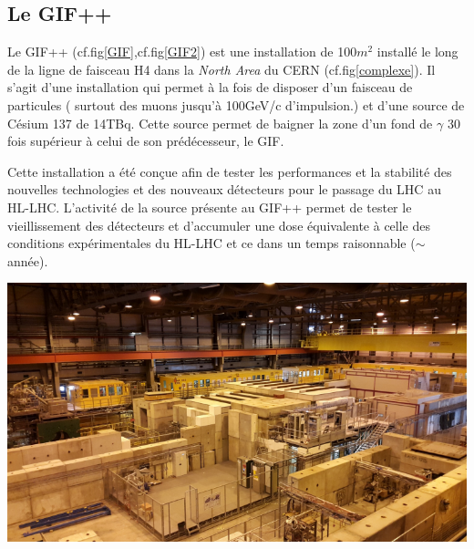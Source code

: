 \subsection{Le GIF++}
Le GIF++ \cite{Jakel:1977147} (cf.fig\ref{GIF},cf.fig\ref{GIF2}) est une installation de 100$m^2$ installé le long de la ligne de faisceau H4 dans la \textit{North Area} du CERN (cf.fig\ref{complexe}). Il s'agit d'une installation qui permet à la fois de disposer d'un faisceau de particules ( surtout des muons jusqu'à 100GeV/c d'impulsion.) et d'une source de Césium 137 de 14TBq. Cette source permet de baigner la zone d'un fond de $\gamma$ 30 fois supérieur à celui de son prédécesseur, le GIF.

Cette installation a été conçue afin de tester les performances et la stabilité des nouvelles technologies et des nouveaux détecteurs pour le passage du LHC au HL-LHC. L'activité de la source présente au GIF++ permet de tester le vieillissement des détecteurs et d'accumuler une dose équivalente à celle des conditions expérimentales du HL-LHC et ce dans un temps raisonnable ($\sim$ année). 

\marginpar
{
	\centering
	\includegraphics[width=\marginparwidth]{GLA/GIF2.png}
	\label{GIF2}
}

